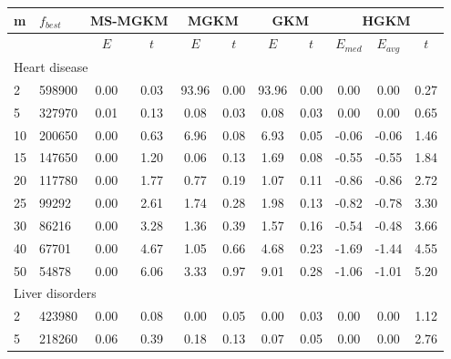 {\footnotesize
\centering
\begin{longtable}{@{}llccccccccc@{}}
m  & $f_{best}$ & \multicolumn{2}{c}{MS-MGKM} & \multicolumn{2}{c}{MGKM} & \multicolumn{2}{c}{GKM} & \multicolumn{3}{c}{HGKM}      \\ \midrule
   &            & $E$          & $t$          & $E$         & $t$        & $E$         & $t$       & $E_{med}$ & $E_{avg}$ & $t$   \\
\multicolumn{11}{l}{Heart disease}                                                                                                 \\
2  & 598900     & 0.00         & 0.03         & 93.96       & 0.00       & 93.96       & 0.00      & 0.00      & 0.00      & 0.27  \\
5  & 327970     & 0.01         & 0.13         & 0.08        & 0.03       & 0.08        & 0.03      & 0.00      & 0.00      & 0.65  \\
10 & 200650     & 0.00         & 0.63         & 6.96        & 0.08       & 6.93        & 0.05      & -0.06     & -0.06     & 1.46  \\
15 & 147650     & 0.00         & 1.20         & 0.06        & 0.13       & 1.69        & 0.08      & -0.55     & -0.55     & 1.84  \\
20 & 117780     & 0.00         & 1.77         & 0.77        & 0.19       & 1.07        & 0.11      & -0.86     & -0.86     & 2.72  \\
25 & 99292      & 0.00         & 2.61         & 1.74        & 0.28       & 1.98        & 0.13      & -0.82     & -0.78     & 3.30  \\
30 & 86216      & 0.00         & 3.28         & 1.36        & 0.39       & 1.57        & 0.16      & -0.54     & -0.48     & 3.66  \\
40 & 67701      & 0.00         & 4.67         & 1.05        & 0.66       & 4.68        & 0.23      & -1.69     & -1.44     & 4.55  \\
50 & 54878      & 0.00         & 6.06         & 3.33        & 0.97       & 9.01        & 0.28      & -1.06     & -1.01     & 5.20  \\
\multicolumn{11}{l}{Liver disorders}                                                                                               \\
2  & 423980     & 0.00         & 0.08         & 0.00        & 0.05       & 0.00        & 0.03      & 0.00      & 0.00      & 1.12  \\
5  & 218260     & 0.06         & 0.39         & 0.18        & 0.13       & 0.07        & 0.05      & 0.00      & 0.00      & 2.76  \\

\end{longtable}}
